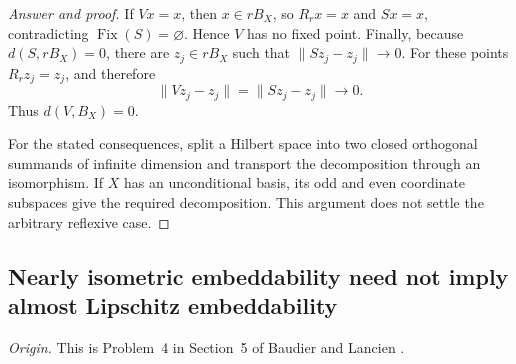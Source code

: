 \documentclass[11pt,reqno]{amsart}
\theoremstyle{plain}
\theoremstyle{definition}
\begin{document}
\begin{proof}[Answer and proof]
If $Vx=x$, then $x\in rB_X$, so $R_rx=x$ and $Sx=x$, contradicting $\operatorname{Fix}(S)=\varnothing$. Hence $V$ has no fixed point. Finally, because $d(S,rB_X)=0$, there are $z_j\in rB_X$ such that $\|Sz_j-z_j\|\to0$. For these points $R_rz_j=z_j$, and therefore
\begin{equation*}
 \|Vz_j-z_j\|=\|Sz_j-z_j\|\longrightarrow0.
\end{equation*}
Thus $d(V,B_X)=0$.

For the stated consequences, split a Hilbert space into two closed orthogonal summands of infinite dimension and transport the decomposition through an isomorphism. If $X$ has an unconditional basis, its odd and even coordinate subspaces give the required decomposition. This argument does not settle the arbitrary reflexive case.
\end{proof}

\subsection{Nearly isometric embeddability need not imply almost Lipschitz embeddability}
\label{sec:selected-nearly-isometric}

\noindent\textit{Origin.} This is Problem~4 in Section~5 of Baudier and Lancien \cite{BaudierLancienTightEmbeddability}.
\end{document}
